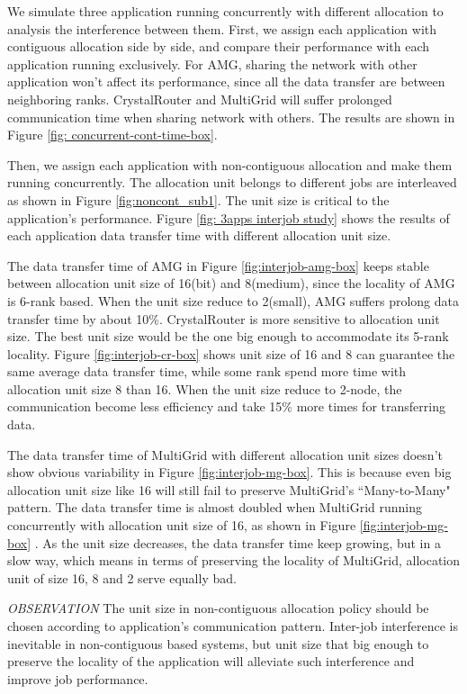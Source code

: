 \documentclass[conference]{IEEEtran}
\begin{document}
We simulate three application running concurrently with different allocation to analysis the interference between them. First, we assign each application with contiguous allocation side by side, and compare their performance with each application running exclusively. For AMG, sharing the network with other application won't affect its performance, since all the data transfer are between neighboring ranks. CrystalRouter and MultiGrid will suffer prolonged communication time when sharing network with others. The results are shown in Figure \ref{fig: concurrent-cont-time-box}.

Then, we assign each application with non-contiguous allocation and make them running concurrently. The allocation unit belongs to different jobs are interleaved as shown in Figure \ref{fig:noncont_sub1}. The unit size is critical to the application's performance. Figure \ref{fig: 3apps interjob study} shows the results of each application data transfer time with different allocation unit size. 

The data transfer time of AMG in Figure \ref{fig:interjob-amg-box} keeps stable between allocation unit size of 16(bit) and 8(medium), since the locality of AMG is 6-rank based. When the unit size reduce to 2(small), AMG suffers prolong data transfer time by about 10\%. CrystalRouter is more sensitive to allocation unit size. The best unit size would be the one big enough to accommodate its 5-rank locality. Figure \ref{fig:interjob-cr-box} shows unit size of 16 and 8 can guarantee the same average data transfer time, while some rank spend more time with allocation unit size 8 than 16. When the unit size reduce to 2-node, the communication become less efficiency and take 15\% more times for transferring data. 

The data transfer time of MultiGrid with different allocation unit sizes doesn't show obvious variability in Figure \ref{fig:interjob-mg-box}. This is because even big allocation unit size like 16 will still fail to preserve MultiGrid's ``Many-to-Many" pattern. The data transfer time is almost doubled when MultiGrid running concurrently with allocation unit size of 16, as shown in Figure \ref{fig:interjob-mg-box} . As the unit size decreases, the data transfer time keep growing, but in a slow way, which means in terms of preserving the locality of MultiGrid, allocation unit of size 16, 8 and 2 serve equally bad.

\emph{OBSERVATION}
The unit size in non-contiguous allocation policy should be chosen according to application's communication pattern. Inter-job interference is inevitable in non-contiguous based systems, but unit size that big enough to preserve the locality of the application will alleviate such interference and improve job performance. 
\end{document}
